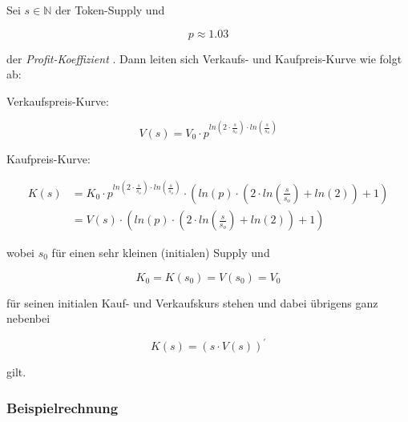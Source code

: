 \begin{Solution}

Sei $s \in \mathbb{N}$ der Token-Supply und 

\begin{equation*}
p \approx 1.03
\end{equation*}

der \textit{Profit-Koeffizient} .
Dann leiten sich Verkaufs- und Kaufpreis-Kurve wie folgt ab:

\vspace{0.2cm}

Verkaufspreis-Kurve:

\begin{equation*}
V(s) = V_{0} \cdot p^{ln\left(2 \cdot \frac{s}{s_{o}}\right) \cdot ln\left(\frac{s}{s_{o}}\right)}
\end{equation*}

\vspace{0.2cm}

Kaufpreis-Kurve:

\begin{align*}
K(s) &= K_{0} \cdot p^{ln\left(2 \cdot \frac{s}{s_{o}}\right) \cdot ln\left(\frac{s}{s_{o}}\right)} \cdot \left( ln(p) \cdot \left( 2 \cdot ln\left( \frac{s}{s_{o}} \right) + ln(2) \right) + 1 \right) \\
 &= V(s) \cdot \left( ln(p) \cdot \left( 2 \cdot ln\left( \frac{s}{s_{o}} \right) + ln(2) \right) + 1 \right)
\end{align*}

\vspace{0.4cm}

wobei $s_{0}$ für einen sehr kleinen (initialen) Supply und 

\begin{equation*}
K_{0} = K(s_{0}) = V(s_{0}) = V_{0}
\end{equation*}

für seinen initialen Kauf- und Verkaufskurs stehen und dabei übrigens ganz nebenbei 

\begin{equation*}
K(s) = \left( s \cdot V(s) \right)^{\prime}
\end{equation*}

gilt.

\end{Solution}

\vspace{0.5cm}


\subsubsection{Beispielrechnung}


